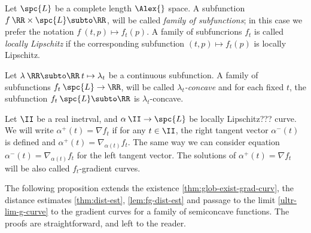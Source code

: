 Let $\spc{L}$ be a complete length $\Alex{}$ space.
A subfunction $f\:\RR\times\spc{L}\subto\RR$, will be called \emph{family of subfunctions};
in this case we prefer the notation $f\:(t,p)\mapsto f_t(p)$.
A family of subfuncrions $f_t$ is called 
\emph{locally Lipschitz}%
if the corresponding subfunction $(t,p)\mapsto f_t(p)$ is locally Lipschitz.

Let $\lambda\:\RR\subto\RR\:t\mapsto \lambda_t$ be a continuous subfunction.
A family of subfunctions $f_t\:\spc{L}\to \RR$, will be called \emph{$\lambda_t$-concave} 
and for each fixed $t$, the subfunction $f_t\:\spc{L}\subto\RR$ is $\lambda_t$-concave. 

Let $\II$ be a real inetrval, and $\alpha\:\II\to\spc{L}$ be locally Lipschitz??? curve.
We will write 
$\alpha^+(t)=\nabla f_t$
if for any $t\in \II$, the right tangent vector $\alpha^-(t)$
is defined and $\alpha^+(t)=\nabla_{\alpha(t)}f_t$.
The same way we can consider equation $\alpha^-(t)=\nabla_{\alpha(t)}f_t$
for the left tangent vector.
The solutions of $\alpha^+(t)=\nabla f_t$ will be also called $f_t$-gradient curves.

The following proposition extends
the existence \ref{thm:glob-exist-grad-curv},
the distance estimates \ref{thm:dist-est}, \ref{lem:fg-dist-est}
and passage to the limit \ref{ultr-lim-g-curve} to the gradient curves for a family of semiconcave functions.
The proofs are straightforward, and left to the reader.

